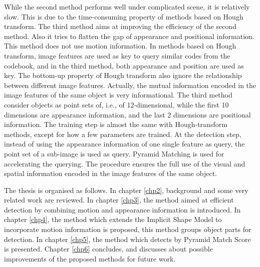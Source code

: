 While the second method performs well under complicated scene, it is relatively slow. This is due to the time-consuming property of methods based on Hough transform.   The third method aims at improving the efficiency of the second method. Also it tries to flatten the gap of appearance and positional information. This method does not use motion information. In methods based on Hough transform, image features are used as key to query similar codes from the codebook, and in the third method, both appearance and position are used as key. The bottom-up property of Hough transform also ignore the relationship between different image features. Actually, the mutual information encoded in the image features of the same object is very informational. The third method consider objects as point sets of, i.e., of 12-dimensional, while the first 10 dimensions are appearance information, and the last 2 dimensions are positional information. The training step is almost the same with Hough-transform methods, except for how a few parameters are trained. At the detection step, instead of using the appearance information of one single feature as query, the point set of a sub-image is used as query. Pyramid Matching is used for accelerating the querying. The procedure ensures the full use of the visual and spatial  information encoded in the image features of the same object.

The thesis is organised as follows. In chapter \ref{chp2}, background and some very related work are reviewed. In chapter \ref{chp3}, the method aimed at efficient detection by combining motion and appearance information is introduced. In chapter \ref{chp4}, the method which extends the Implicit Shape Model to incorporate motion information is proposed, this method groups object parts for detection. In chapter \ref{chp5}, the method which detects by Pyramid Match Score is presented. Chapter \ref{chp6} concludes, and discusses about possible improvements of the proposed methods for future work.



